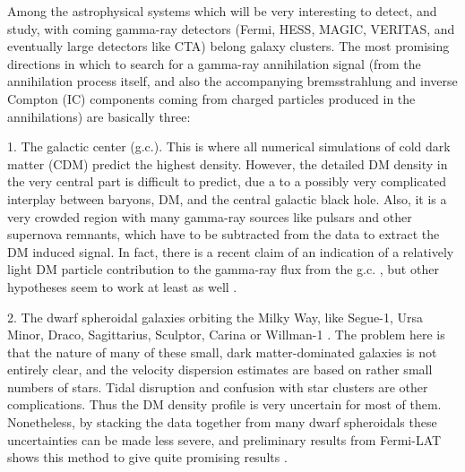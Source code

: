 \documentclass[10pt,aps,pra,reprint,amsmath,amsfonts,amssymb,showpacs,nofootinbib,floatfix]{revtex4-1}
\begin{document}
Among the astrophysical systems which will be very interesting to
detect, and study, with coming gamma-ray detectors (Fermi, HESS,
MAGIC, VERITAS, and eventually large detectors like CTA) belong galaxy
clusters. The most promising directions in which to search for a
gamma-ray annihilation signal (from the annihilation process itself,
and also the accompanying bremsstrahlung and inverse Compton (IC)
components coming from charged particles produced in the annihilations)
are basically three:

1. The galactic center (g.c.). This is where all numerical simulations
of cold dark matter (CDM) predict the highest density. However, the
detailed DM density in the very central part is difficult to predict,
due a to a possibly very complicated interplay between baryons, DM,
and the central galactic black hole. Also, it is a very crowded region
with many gamma-ray sources like pulsars and other supernova remnants,
which have to be subtracted from the data to extract the DM induced
signal. In fact, there is a recent claim of an indication of a
relatively light DM particle contribution to the gamma-ray flux from
the g.c. \cite{2010arXiv1010.2752H}, but other hypotheses seem to work
at least as well \cite{2010arXiv1012.5839B}.

2. The dwarf spheroidal galaxies orbiting the Milky Way, like Segue-1,
Ursa Minor, Draco, Sagittarius, Sculptor, Carina or Willman-1
\cite{2009JCAP...01..016B,2010ApJ...720.1174A,2010JCAP...01..031S,2010JCAP...01..031S}. The
problem here is that the nature of many of these small, dark
matter-dominated galaxies is not entirely clear, and the velocity
dispersion estimates are based on rather small numbers of stars. Tidal
disruption and confusion with star clusters are other
complications. Thus the DM density profile is very uncertain for most
of them. Nonetheless, by stacking the data together from many dwarf
spheroidals these uncertainties can be made less severe, and
preliminary results from Fermi-LAT shows this method to give quite
promising results \cite{garde}.
\end{document}
